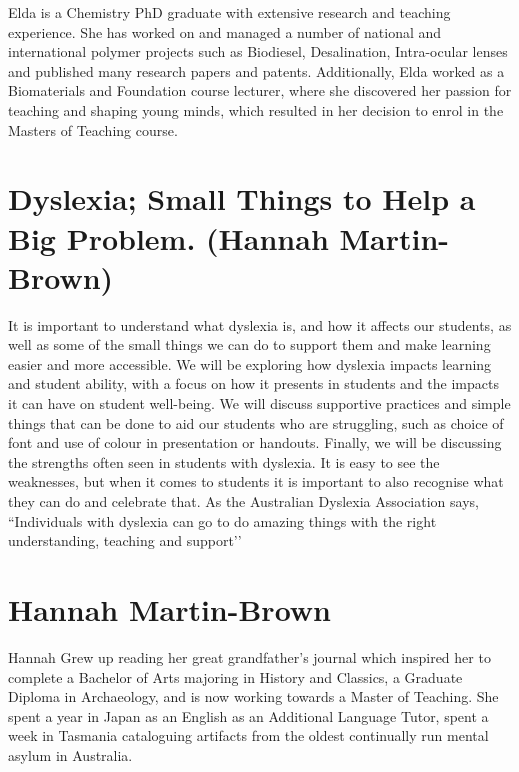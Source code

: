 \documentclass[twoside,12pt,a4paper,notitlepage]{memoir}
\begin{document}
Elda is a Chemistry PhD graduate with extensive research and teaching experience. She has worked on and managed a number of national and international polymer projects such as Biodiesel, Desalination, Intra-ocular lenses and published many research papers and patents. Additionally, Elda worked as a Biomaterials and Foundation course lecturer, where she discovered her passion for teaching and shaping young minds, which resulted in her decision to enrol in the Masters of Teaching course.



\pagebreak
\section*{Dyslexia; Small Things to Help a Big Problem. (Hannah Martin-Brown)}
\label{aut:brown}


It is important to understand what dyslexia is, and how it affects our students, as well as some of the small things we can do to support them and make learning easier and more accessible.
We will be exploring how dyslexia impacts learning and student ability, with a focus on how it presents in students and the impacts it can have on student well-being. We will discuss supportive practices and simple things that can be done to aid our students who are struggling, such as choice of font and use of colour in presentation or handouts.
Finally, we will be discussing the strengths often seen in students with dyslexia. It is easy to see the weaknesses, but when it comes to students it is important to also recognise what they can do and celebrate that. As the Australian Dyslexia Association says, ``Individuals with dyslexia can go to do amazing things with the right understanding, teaching and support’’


\section*{Hannah Martin-Brown}

Hannah Grew up reading her great grandfather’s journal which inspired her to complete a Bachelor of Arts majoring in History and Classics, a Graduate Diploma in Archaeology, and is now working towards a Master of Teaching. She spent a year in Japan as an English as an Additional Language Tutor, spent a week in Tasmania cataloguing artifacts from the oldest continually run mental asylum in Australia.
\end{document}
